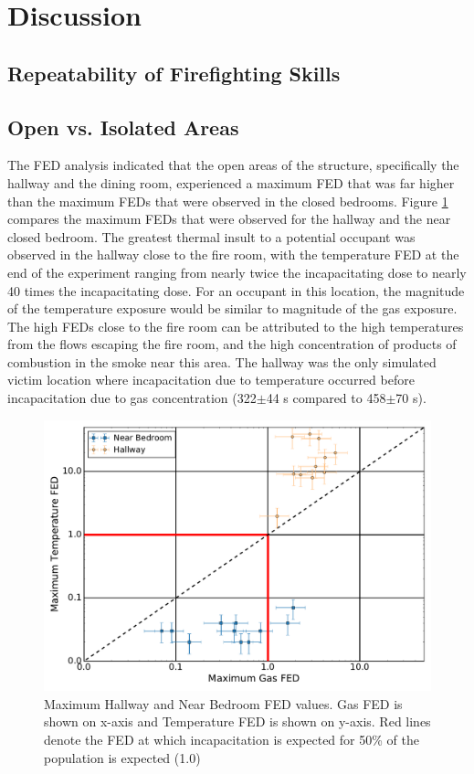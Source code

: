 \documentclass[12pt,oneside]{article}
\begin{document}
\section{Discussion}

\subsection{Repeatability of Firefighting Skills}

\subsection{Open vs. Isolated Areas}
\label{subsec:open_v_iso}

The FED analysis indicated that the open areas of the structure, specifically the hallway and the dining room, experienced a maximum FED that was far higher than the maximum FEDs that were observed in the closed bedrooms. Figure \ref{fig:near_FED_compare} compares the maximum FEDs that were observed for the hallway and the near closed bedroom. The greatest thermal insult to a potential occupant was observed in the hallway close to the fire room, with the temperature FED at the end of the experiment ranging from nearly twice the incapacitating dose to nearly 40 times the incapacitating dose. For an occupant in this location, the magnitude of the temperature exposure would be similar to magnitude of the gas exposure. The high FEDs close to the fire room can be attributed to the high temperatures from the flows escaping the fire room, and the high concentration of products of combustion in the smoke near this area. The hallway was the only simulated victim location where incapacitation due to temperature occurred before incapacitation due to gas concentration (322$\pm$44 s compared to 458$\pm$70 s).
\begin{figure}[!ht]	
	\centering
	\includegraphics[width=.75\textwidth]{../Figures/br_compare/Near}
	\caption[Maximum Hallway and Near Bedroom FED values]{Maximum Hallway and Near Bedroom FED values. Gas FED is shown on x-axis and Temperature FED is shown on y-axis. Red lines denote the FED at which incapacitation is expected for 50\% of the population is expected (1.0)}
	\label{fig:near_FED_compare}
\end{figure}
\end{document}
